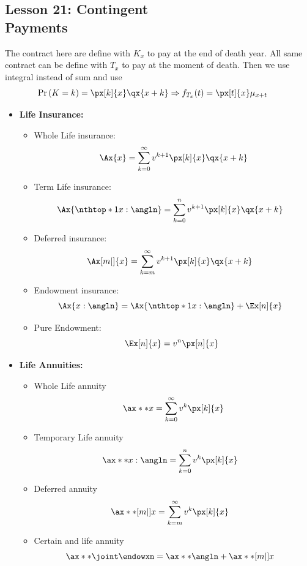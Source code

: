 \documentclass[10pt, french]{article}
\begin{document}
\begin{multicols*}{3}
\section*{Lesson 21: Contingent \\ Payments}
The contract here are define with $K_x$ to pay at the end of death year. All same contract can be define with $T_x$ to pay at the moment of death. Then we use integral instead of sum and use \[\hspace*{-5mm} \prob{K=k}=\px[k]{x} \qx{x+k} \Rightarrow f_{T_x}(t) = \px[t]{x} \mu_{x+t}\]
\begin{itemize}[align=left,leftmargin=*]
    \item \textbf{Life Insurance:} 
    \begin{itemize}
        \item Whole Life insurance: \[ \Ax{x} = \sum_{k=0}^\infty v^{k+1} \px[k]{x} \qx{x+k} \]
        \item Term Life insurance: \[\hspace*{-2.8mm} \Ax{\nthtop*{1}{x}:\angln} = \sum_{k=0}^n v^{k+1} \px[k]{x} \qx{x+k} \]
        \item Deferred insurance: \[\hspace*{-3mm} \Ax[m|]{x} = \sum_{k=m}^\infty v^{k+1} \px[k]{x} \qx{x+k} \]
        \item Endowment insurance: \[\hspace*{-2.8mm} \Ax{x:\angln} = \Ax{\nthtop*{1}{x}:\angln} + \Ex[n]{x} \]
        \item Pure Endowment: \[\hspace*{-1.4mm} \Ex[n]{x} = v^n \px[n]{x} \] 
    \end{itemize}
    \item \textbf{Life Annuities:}
    \begin{itemize}
        \item Whole Life annuity \[ \ax**{x} = \sum_{k=0}^\infty v^k \px[k]{x} \]
        \item Temporary Life annuity \[\hspace*{-2.8mm} \ax**{x:\angln} = \sum_{k=0}^n v^k \px[k]{x} \]
        \item Deferred annuity \[\hspace*{-3mm} \ax**[m|]{x} = \sum_{k=m}^\infty v^k \px[k]{x} \]
        \item Certain and life annuity \[\hspace*{-2.8mm} \ax**{\joint\endowxn} =  \ax**{\angln} + \ax**[m|]{x} \]
    \end{itemize}

\end{itemize}
\end{multicols*}
\end{document}
